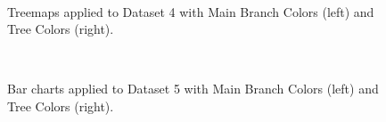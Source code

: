 \documentclass[journal]{vgtc}                %
\begin{document}
\begin{figure}[!t]
  \centering
  \mbox{
  }
  \caption{Treemaps applied to Dataset 4 with Main Branch Colors (left) and Tree Colors (right).}\label{fig:treemapSvy}
\vspace{-1ex}
\end{figure}


\begin{figure}[!b]
  \centering
  \vspace{-1ex}
  \mbox{
  }
  \caption{Bar charts applied to Dataset 5 with Main Branch Colors (left) and Tree Colors (right).}\label{fig:barSvy}

\end{figure}
\end{document}
